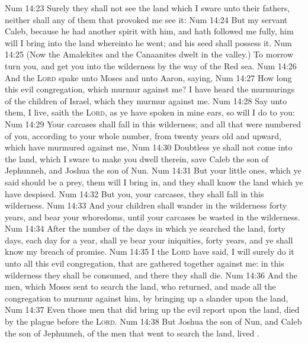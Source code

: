 \vs Num 14:23 Surely they shall not see the land which I sware unto their fathers, neither shall any of them that provoked me see it:
\vs Num 14:24 But my servant Caleb, because he had another spirit with him, and hath followed me fully, him will I bring into the land whereinto he went; and his seed shall possess it.
\vs Num 14:25 (Now the Amalekites and the Canaanites dwelt in the valley.) To morrow turn you, and get you into the wilderness by the way of the Red sea.
\vs Num 14:26 And the \textsc{Lord} spake unto Moses and unto Aaron, saying,
\vs Num 14:27 How long  this evil congregation, which murmur against me? I have heard the murmurings of the children of Israel, which they murmur against me.
\vs Num 14:28 Say unto them,  I live, saith the \textsc{Lord}, as ye have spoken in mine ears, so will I do to you:
\vs Num 14:29 Your carcases shall fall in this wilderness; and all that were numbered of you, according to your whole number, from twenty years old and upward, which have murmured against me,
\vs Num 14:30 Doubtless ye shall not come into the land,  which I sware to make you dwell therein, save Caleb the son of Jephunneh, and Joshua the son of Nun.
\vs Num 14:31 But your little ones, which ye said should be a prey, them will I bring in, and they shall know the land which ye have despised.
\vs Num 14:32 But  you, your carcases, they shall fall in this wilderness.
\vs Num 14:33 And your children shall wander in the wilderness forty years, and bear your whoredoms, until your carcases be wasted in the wilderness.
\vs Num 14:34 After the number of the days in which ye searched the land,  forty days, each day for a year, shall ye bear your iniquities,  forty years, and ye shall know my breach of promise.
\vs Num 14:35 I the \textsc{Lord} have said, I will surely do it unto all this evil congregation, that are gathered together against me: in this wilderness they shall be consumed, and there they shall die.
\vs Num 14:36 And the men, which Moses sent to search the land, who returned, and made all the congregation to murmur against him, by bringing up a slander upon the land,
\vs Num 14:37 Even those men that did bring up the evil report upon the land, died by the plague before the \textsc{Lord}.
\vs Num 14:38 But Joshua the son of Nun, and Caleb the son of Jephunneh,  of the men that went to search the land, lived .
